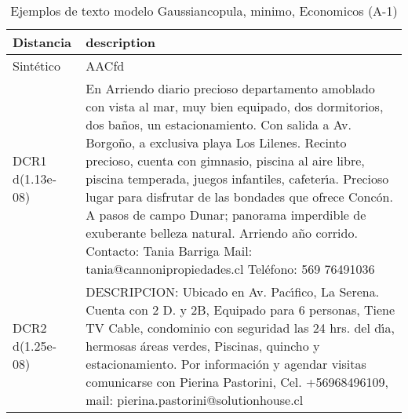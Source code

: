 \begin{table}[H]
\centering
\fontsize{10}{14}\selectfont
\caption{Ejemplos de texto modelo Gaussiancopula, minimo, Economicos (A-1)}
\label{table-example-economicos-a-1-gaussiancopula-min-text}
\begin{tabular}{|l|m{35em}|}
\hline
\rowcolor[gray]{0.8}
Distancia & description \\
\hline Sintético & AACfd \\
\hline DCR1 d(1.13e-08) & En Arriendo diario precioso departamento amoblado con vista al mar, muy bien equipado, dos dormitorios, dos ba\~nos, un estacionamiento. Con salida a Av. Borgo\~no, a exclusiva playa Los Lilenes. Recinto precioso, cuenta con gimnasio, piscina al aire libre, piscina temperada, juegos infantiles, cafeter{\'\i}a. Precioso lugar para disfrutar de las bondades que ofrece Conc\'on. A pasos de campo Dunar; panorama imperdible de exuberante belleza natural. Arriendo a\~no corrido.  Contacto: Tania Barriga Mail: tania@cannonipropiedades.cl Tel\'efono: 569 76491036 \\
\hline DCR2 d(1.25e-08) & DESCRIPCION: Ubicado en Av. Pac{\'\i}fico, La Serena. Cuenta con 2 D. y 2B, Equipado para 6 personas, Tiene TV Cable, condominio con seguridad las 24 hrs. del d{\'\i}a, hermosas \'areas verdes, Piscinas, quincho y estacionamiento.  Por informaci\'on y agendar visitas comunicarse con Pierina Pastorini, Cel. +56968496109, mail: pierina.pastorini@solutionhouse.cl \\
\hline
\end{tabular}
\end{table}
